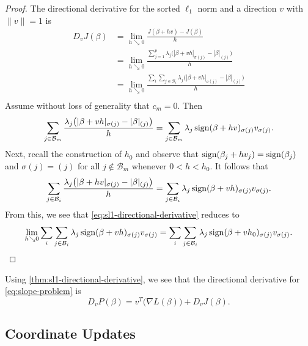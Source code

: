 \begin{proof}
  The directional derivative for the sorted \(\ell_1\) norm and a direction
  \(v\) with \(\lVert v \rVert = 1\) is
  \begin{equation}
    \label{eq:sl1-directional-derivative}
    \begin{aligned}
      D_v J(\beta) & = \lim_{h \searrow 0} \frac{J(\beta + h v) - J(\beta)}{h}                                                                    \\
                   & = \lim_{h \searrow 0} \frac{\sum_{j=1}^p\lambda_j\big(|\beta + vh|_{\sigma(j)} - |\beta|_{(j)}\big)}{h}                      \\
                   & = \lim_{h \searrow 0}\frac{\sum_i \sum_{j \in \mathcal{B}_i} \lambda_j\big(|\beta + vh|_{\sigma(j)} - |\beta|_{(j)}\big)}{h} \\
    \end{aligned}
  \end{equation}
  Assume without loss of generality that \(c_m = 0\).
  Then
  \[
    \sum_{j \in \mathcal{B}_m}\frac{\lambda_j \big( |\beta + vh|_{\sigma(j)} - |\beta|_{(j)}\big)}{h}
    = \sum_{j \in \mathcal{B}_m} \lambda_j \operatorname{sign}(\beta + hv)_{\sigma(j)}v_{\sigma(j)}.
  \]
  Next, recall the construction of \(h_0\) and
  observe that \(\operatorname{sign}(\beta_j + hv_j) = \operatorname{sign}(\beta_j)\)
  and \(\sigma(j) = (j)\) for all \(j \notin \mathcal{B}_m\)
  whenever \(0 < h < h_0\).
  It follows that
  \[
    \sum_{j \in \mathcal{B}_i} \frac{\lambda_j\big(|\beta + hv|_{\sigma(j)} - |\beta|_{(j)}\big)}{h}
    = \sum_{j \in \mathcal{B}_i} \lambda_j\operatorname{sign}(\beta + vh)_{\sigma(j)}v_{\sigma(j)}.
  \]
  From this, we see that \eqref{eq:sl1-directional-derivative} reduces to
  \[
    \lim_{h \searrow 0} \sum_i \sum_{j \in \mathcal{B}_i} \lambda_j\operatorname{sign}(\beta + vh)_{\sigma(j)}v_{\sigma(j)}
    = \sum_i \sum_{j \in \mathcal{B}_i} \lambda_j\operatorname{sign}(\beta + vh_0)_{\sigma(j)}v_{\sigma(j)}.
  \]
\end{proof}

\begin{remark}
  Using \cref{thm:sl1-directional-derivative}, we see that
  the directional derivative for \eqref{eq:slope-problem} is
  \[
    D_v P(\beta) = v^T \big(\nabla L(\beta)\big) + D_v J(\beta).
  \]
\end{remark}

\subsection{Coordinate Updates}%
\label{sec:coordinate-updates}

